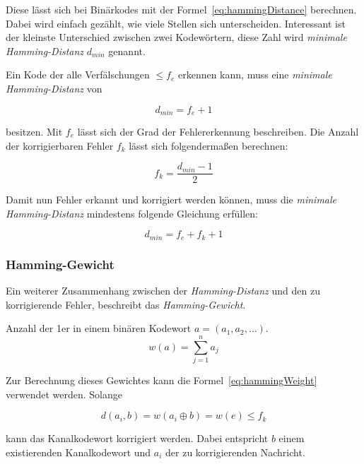 Diese lässt sich bei Binärkodes mit der Formel~\ref{eq:hammingDistance} berechnen. Dabei wird einfach gezählt, wie viele Stellen sich unterscheiden. Interessant ist der kleinste Unterschied zwischen zwei Kodewörtern, diese Zahl wird \emph{minimale Hamming-Distanz} $d_{min}$ genannt.

Ein Kode der alle Verfälschungen $\leq f_e$ erkennen kann, muss eine \emph{minimale Hamming-Distanz} von 

\begin{equation}
d_{min} = f_e + 1
\end{equation}

besitzen. Mit $f_e$ lässt sich der Grad der Fehlererkennung beschreiben. Die Anzahl der korrigierbaren Fehler $f_k$ lässt sich folgendermaßen berechnen:

\begin{equation}
f_k = \frac{d_{min}-1}{2}
\end{equation}

Damit nun Fehler erkannt und korrigiert werden können, muss die \emph{minimale Hamming-Distanz} mindestens folgende Gleichung erfüllen:~\cite[S.~132~f.]{schoenfeld2012informations}

\begin{equation}
d_{min} = f_e + f_k + 1
\end{equation} 

\subsubsection{Hamming-Gewicht}
\label{sec:hammingWeight}
Ein weiterer Zusammenhang zwischen der \emph{Hamming-Distanz} und den zu korrigierende Fehler, beschreibt das \emph{Hamming-Gewicht}.

\begin{t_def}
Anzahl der 1er in einem binären Kodewort $a=(a_1,a_2,\dotsc)$.
\begin{equation}
w(a) = \sum^n_{j=1} a_j
\label{eq:hammingWeight}
\end{equation} 
\end{t_def} 

Zur Berechnung dieses Gewichtes kann die Formel~\ref{eq:hammingWeight} verwendet werden. Solange 

\begin{equation}
d(a_i,b)=w(a_i \oplus b) = w(e) \leq f_k
\end{equation} 

kann das Kanalkodewort korrigiert werden. Dabei entspricht $b$ einem existierenden Kanalkodewort und $a_i$ der zu korrigierenden Nachricht.~\cite[134]{schoenfeld2012informations}
